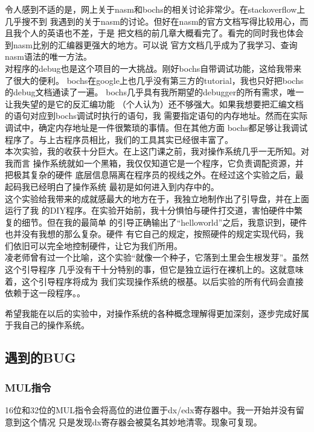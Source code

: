 \documentclass[a4paper]{article}
\begin{document}
令人感到不适的是，网上关于nasm和bochs的相关讨论非常少。在stackoverflow上几乎搜不到
我遇到的关于nasm的讨论。但好在nasm的官方文档写得比较用心，而且我个人的英语也不差，于是
把文档的前几章大概看完了。看完的同时我也体会到nasm比别的汇编器更强大的地方。可以说
官方文档几乎成为了我学习、查询nasm语法的唯一方法。\\

对程序的debug也是这个项目的一大挑战。刚好bochs自带调试功能，这给我带来了很大的便利。
bochs在google上也几乎没有第三方的tutorial，我也只好把bochs的debug文档通读了一遍。
bochs几乎具有我所期望的debugger的所有需求，唯一让我失望的是它的反汇编功能
（个人认为）还不够强大。如果我想要把汇编文档的语句对应到bochs调试时执行的语句，我
需要指定语句的内存地址。然而在实际调试中，确定内存地址是一件很繁琐的事情。但在其他方面
bochs都足够让我调试程序了。与上古程序员相比，我们的工具其实已经很丰富了。\\ 

本次实验，我的收获十分巨大。在上这门课之前，我对操作系统几乎一无所知。对我而言
操作系统就如一个黑箱，我仅仅知道它是一个程序，它负责调配资源，并把极其复杂的硬件
底层信息隔离在程序员的视线之外。在经过这个实验之后，最起码我已经明白了操作系统
最初是如何进入到内存中的。\\

这个实验给我带来的成就感最大的地方在于，我独立地制作出了引导盘，并在上面运行了我
的DIY程序。在实验开始前，我十分惧怕与硬件打交道，害怕硬件中繁复的细节。但在我的最简单
的引导正确输出了“helloworld”之后，我意识到，硬件也并没有我想的那么复杂。硬件
有它自己的规定，按照硬件的规定实现代码，我们依旧可以完全地控制硬件，让它为我们所用。\\ 

凌老师曾有过一个比喻，这个实验“就像一个种子，它落到土里会生根发芽”。虽然这个引导程序
几乎没有干十分特别的事，但它是独立运行在裸机上的。这就意味着，这个引导程序将成为
我们实现操作系统的根基。以后实验的所有代码会直接依赖于这一段程序。。

希望我能在以后的实验中，对操作系统的各种概念理解得更加深刻，逐步完成好属于我自己的操作系统。
\subsection{遇到的BUG}
\subsubsection{MUL指令}
16位和32位的MUL指令会将高位的进位置于dx/edx寄存器中。我一开始并没有留意到这个情况
只是发现dx寄存器会被莫名其妙地清零。现象可复现。\\
\end{document}
